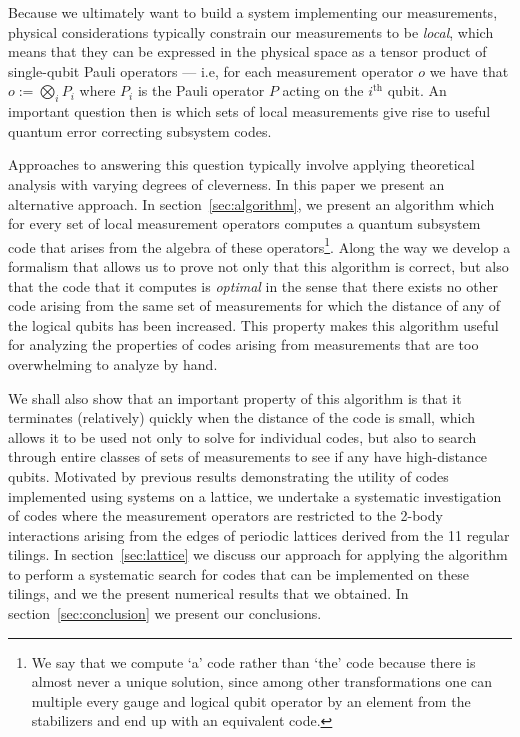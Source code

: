 \documentclass{amsbook}
\theoremstyle{plain}
\theoremstyle{definition}
\theoremstyle{remark}
\begin{document}
Because we ultimately want to build a system implementing our measurements, physical considerations typically constrain our measurements to be \emph{local}, which means that they can be expressed in the physical space as a tensor product of single-qubit Pauli operators --- i.e, for each measurement operator $o$ we have that
$o := \bigotimes_i P_i$ where $P_i$ is the Pauli operator $P$ acting on the $i^{\text{th}}$ qubit.  An important question then is which sets of local measurements give rise to useful quantum error correcting subsystem codes.

Approaches to answering this question typically involve applying theoretical analysis with varying degrees of cleverness.  In this paper we present an alternative approach.  In section~\ref{sec:algorithm}, we present an algorithm which for every set of local measurement operators computes a quantum subsystem code that arises from the algebra of these operators\footnote{We say that we compute `a' code rather than `the' code because there is almost never a unique solution, since among other transformations one can multiple every gauge and logical qubit operator by an element from the stabilizers and end up with an equivalent code.}.  Along the way we develop a formalism that allows us to prove not only that this algorithm is correct, but also that the code that it computes is \emph{optimal} in the sense that there exists no other code arising from the same set of measurements for which the distance of any of the logical qubits has been increased.  This property makes this algorithm useful for analyzing the properties of codes arising from measurements that are too overwhelming to analyze by hand.  

We shall also show that an important property of this algorithm is that it terminates (relatively) quickly when the distance of the code is small, which allows it to be used not only to solve for individual codes, but also to search through entire classes of sets of measurements to see if any have high-distance qubits.  Motivated by previous results demonstrating the utility of codes implemented using systems on a lattice, we undertake a systematic investigation of codes where the measurement operators are restricted to the 2-body interactions arising from the edges of periodic lattices derived from the 11 regular tilings.  In section~\ref{sec:lattice} we discuss our approach for applying the algorithm to perform a systematic search for codes that can be implemented on these tilings, and we the present numerical results that we obtained. In section~\ref{sec:conclusion} we present our conclusions.
\end{document}
